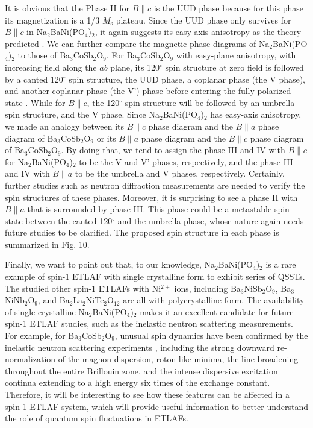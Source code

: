 \documentclass[aps,twocolumn,superscriptaddress,showpacs]{revtex4-1}
\begin{document}
It is obvious that the Phase II for $B \parallel c$ is the UUD phase because for this phase its magnetization is a 1/3 $M_{\text{s}}$ plateau. Since the UUD phase only survives for $B \parallel c$ in Na$_2$BaNi(PO$_4$)$_2$, it again suggests its easy-axis anisotropy as the theory predicted \cite{miyashita1986magnetic}. We can further compare the magnetic phase diagrams of Na$_2$BaNi(PO$_4$)$_2$ to those of Ba$_3$CoSb$_2$O$_9$. For Ba$_3$CoSb$_2$O$_9$ with easy-plane anisotropy, with increasing field along the $ab$ plane, its 120$^\circ$ spin structure at zero field is followed by a canted 120$^\circ$ spin structure, the UUD phase, a coplanar phase (the V phase), and another coplanar phase (the V') phase before entering the fully polarized state  \cite{PhysRevB.103.184425, PhysRevLett.112.127203, PhysRevB.93.224402, PhysRevB.91.081104, PhysRevB.91.024410, PhysRevB.94.214408, PhysRevB.100.094436}. While for $B \parallel c$, the 120$^\circ$ spin structure will be followed by an umbrella spin structure, and the V phase. Since Na$_2$BaNi(PO$_4$)$_2$ has easy-axis anisotropy, we made an analogy between its $B \parallel c$ phase diagram and the $B \parallel a$ phase diagram of Ba$_3$CoSb$_2$O$_9$ or its $B \parallel a$ phase diagram and the $B \parallel c$ phase diagram of Ba$_3$CoSb$_2$O$_9$. By doing that, we tend to assign the phase III and IV with $B \parallel c$ for Na$_2$BaNi(PO$_4$)$_2$ to be the V and V' phases, respectively, and the phase III and IV with $B \parallel a$ to be the umbrella and V phases, respectively. Certainly, further studies such as neutron diffraction measurements are needed to verify the spin structures of these phases. Moreover, it is surprising to see a phase II with $B \parallel a$ that is surrounded by phase III. This phase could be a metastable spin state between the canted 120$^\circ$ and the umbrella phase, whose nature again needs future studies to be clarified. The proposed spin structure in each phase is summarized in Fig. 10.

Finally, we want to point out that, to our knowledge, Na$_2$BaNi(PO$_4$)$_2$ is a rare example of spin-1 ETLAF with single crystalline form to exhibit series of QSSTs. The studied other spin-1 ETLAFs with Ni$^{2+}$ ions, including Ba$_3$NiSb$_2$O$_9$, Ba$_3$NiNb$_2$O$_9$, and Ba$_2$La$_2$NiTe$_2$O$_{12}$ are all with polycrystalline form. The availability of single crystalline Na$_2$BaNi(PO$_4$)$_2$ makes it an excellent candidate for future spin-1 ETLAF studies, such as the inelastic neutron scattering measurements. For example, for Ba$_3$CoSb$_2$O$_9$, unusual spin dynamics have been confirmed by the inelastic neutron scattering experiments \cite{zhou2012successive, PhysRevLett.116.087201, ISI:000407401000006, ISI:000438031000004, PhysRevB.102.064421, ISI:000478082100017}, including the strong downward re-normalization of the magnon dispersion, roton-like minima, the line broadening throughout the entire Brillouin zone, and the intense dispersive excitation continua extending to a high energy six times of the exchange constant. Therefore, it will be interesting to see how these features can be affected in a spin-1 ETLAF system, which will provide useful information to better understand the role of quantum spin fluctuations in ETLAFs.
\end{document}
